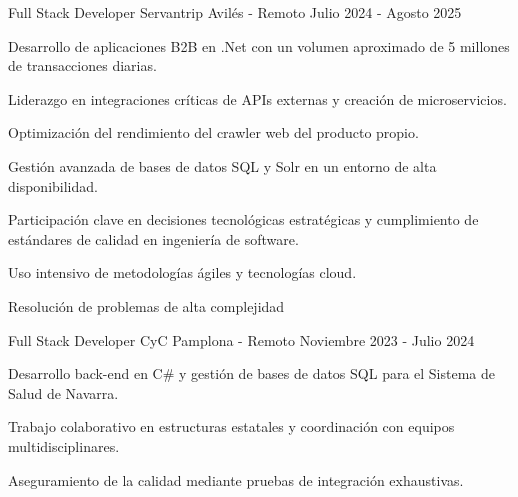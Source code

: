 
\begin{cventries}
    \cventry
    {Full Stack Developer} %
    {Servantrip} %
    {Avilés - Remoto} %
    {Julio 2024 - Agosto 2025} %
    {
        \begin{cvitems} %
            \item {Desarrollo de aplicaciones B2B en .Net con un volumen aproximado de 5 millones de transacciones diarias.}
            \item {Liderazgo en integraciones críticas de APIs externas y creación de microservicios.}
            \item {Optimización del rendimiento del crawler web del producto propio.}
            \item {Gestión avanzada de bases de datos SQL y Solr en un entorno de alta disponibilidad.}
            \item {Participación clave en decisiones tecnológicas estratégicas y cumplimiento de estándares de calidad en ingeniería de software.}
            \item {Uso intensivo de metodologías ágiles y tecnologías cloud.}
            \item {Resolución de problemas de alta complejidad}
        \end{cvitems}
    }
    \cventry
    {Full Stack Developer} %
    {CyC} %
    {Pamplona - Remoto} %
    {Noviembre 2023 - Julio 2024} %
    {
        \begin{cvitems}
            \item {Desarrollo back-end en C# y gestión de bases de datos SQL para el Sistema de Salud de Navarra.}
            \item {Trabajo colaborativo en estructuras estatales y coordinación con equipos multidisciplinares.}
            \item {Aseguramiento de la calidad mediante pruebas de integración exhaustivas.}
        \end{cvitems}
}
\end{cventries}
